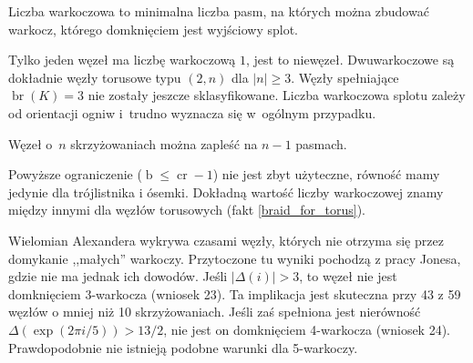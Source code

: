 \begin{definition}
    Liczba warkoczowa to minimalna liczba pasm, na których można zbudować warkocz, którego domknięciem jest wyjściowy splot.
\end{definition}

Tylko jeden węzeł ma liczbę warkoczową $1$, jest to niewęzeł.
Dwuwarkoczowe są dokładnie węzły torusowe typu $(2, n)$ dla $|n| \ge 3$.
Węzły spełniające $\operatorname{br} (K) = 3$ nie zostały jeszcze sklasyfikowane.
Liczba warkoczowa splotu zależy od orientacji ogniw i~trudno wyznacza się w~ogólnym przypadku.

\begin{proposition}
    Węzeł o~$n$ skrzyżowaniach można zapleść na $n - 1$ pasmach.
\end{proposition}

Powyższe ograniczenie ($\operatorname{b} \le \operatorname{cr} - 1$) nie jest zbyt użyteczne, równość mamy jedynie dla trójlistnika i ósemki.
Dokładną wartość liczby warkoczowej znamy między innymi dla węzłów torusowych (fakt \ref{braid_for_torus}).

Wielomian Alexandera wykrywa czasami węzły, których nie otrzyma się przez domykanie ,,małych'' warkoczy.
Przytoczone tu wyniki pochodzą z pracy \cite{jones85} Jonesa, gdzie nie ma jednak ich dowodów.
Jeśli $|\Delta(i)| > 3$, to węzeł nie jest domknięciem 3-warkocza (wniosek 23).
Ta implikacja jest skuteczna przy 43 z 59 węzłów o mniej niż 10 skrzyżowaniach.
Jeśli zaś spełniona jest nierówność $\Delta (\exp (2\pi i / 5)) > 13/2$, nie jest on domknięciem 4-warkocza (wniosek 24).
Prawdopodobnie nie istnieją podobne warunki dla 5-warkoczy.


